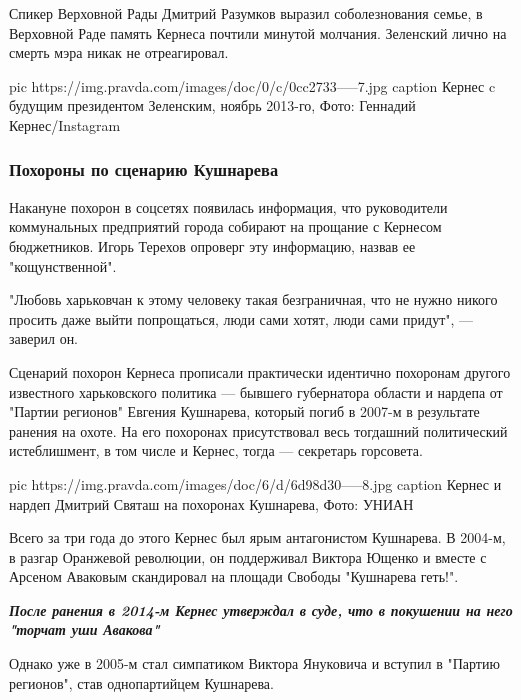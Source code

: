Спикер Верховной Рады Дмитрий Разумков выразил соболезнования семье, в
Верховной Раде память Кернеса почтили минутой молчания. Зеленский лично на
смерть мэра никак не отреагировал.

\ifcmt
pic https://img.pravda.com/images/doc/0/c/0cc2733-----7.jpg
caption Кернес c будущим президентом Зеленским, ноябрь 2013-го, Фото: Геннадий Кернес/Instagram
\fi

\subsubsection{Похороны по сценарию Кушнарева }

Накануне похорон в соцсетях появилась информация, что руководители коммунальных
предприятий города собирают на прощание с Кернесом бюджетников. Игорь Терехов
опроверг эту информацию, назвав ее "кощунственной". 

"Любовь харьковчан к этому человеку такая безграничная, что не нужно никого
просить даже выйти попрощаться, люди сами хотят, люди сами придут", — заверил
он.

Сценарий похорон Кернеса прописали практически идентично похоронам другого
известного харьковского политика — бывшего губернатора области и нардепа от
"Партии регионов" Евгения Кушнарева, который погиб в 2007-м в результате
ранения на охоте. На его похоронах присутствовал весь тогдашний политический
истеблишмент, в том числе и Кернес, тогда — секретарь горсовета.

\ifcmt
pic https://img.pravda.com/images/doc/6/d/6d98d30-----8.jpg
caption Кернес и нардеп Дмитрий Святаш на похоронах Кушнарева, Фото: УНИАН
\fi

Всего за три года до этого Кернес был ярым антагонистом Кушнарева. В 2004-м, в
разгар Оранжевой революции, он поддерживал Виктора Ющенко и вместе с Арсеном
Аваковым скандировал на площади Свободы "Кушнарева геть!". 


\begin{leftbar}
  \begingroup
    \em\Large\bfseries\color{blue}
    После ранения в 2014-м Кернес утверждал в суде, что в покушении на него "торчат уши Авакова"
  \endgroup
\end{leftbar}

Однако уже в 2005-м стал симпатиком Виктора Януковича и вступил в "Партию
регионов", став однопартийцем Кушнарева. 

